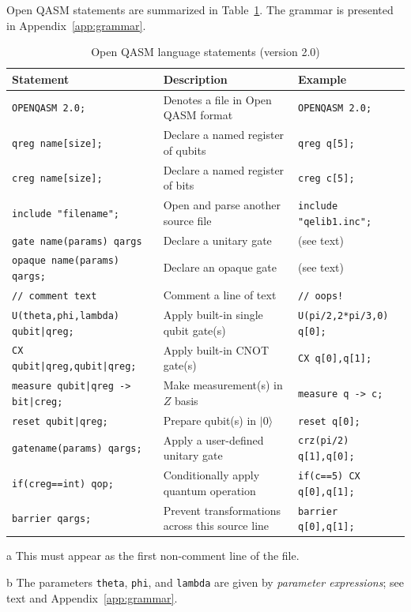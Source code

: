 \documentclass[USenglish,12pt,fleqn]{article} %
\newcommand*{\code}{\texttt}
\begin{document}
Open QASM statements are summarized in Table~\ref{tab:qasm:new}. The grammar is presented in Appendix~\ref{app:grammar}.

\begin{landscape}
\begin{table}[htbp]
\begin{threeparttable}
\caption{Open QASM language statements (version 2.0)\label{tab:qasm:new}}
\begin{tabular}{@{}lll@{}}
\toprule
Statement & Description & Example \\
\midrule
\code{OPENQASM 2.0;} & Denotes a file in Open QASM format\tnote{a} & \code{OPENQASM 2.0;}\\
\code{qreg name[size];} & Declare a named register of qubits & \code{qreg q[5];} \\
\code{creg name[size];} & Declare a named register of bits & \code{creg c[5];} \\
\code{include "filename";} & Open and parse another source file & \code{include "qelib1.inc";} \\ 
\code{gate name(params) qargs \string{ body \string}} & Declare a unitary gate &  (see text) \\
\code{opaque name(params) qargs;} & Declare an opaque gate & (see text) \\
\code{// comment text} & Comment a line of text & \code{// oops!} \\
\midrule
\code{U(theta,phi,lambda) qubit|qreg;} & Apply built-in single qubit gate(s)\tnote{b} & \code{U(pi/2,2*pi/3,0) q[0];} \\
\code{CX qubit|qreg,qubit|qreg;} & Apply built-in CNOT gate(s) & \code{CX q[0],q[1];} \\
\code{measure qubit|qreg -> bit|creg;} & Make measurement(s) in $Z$ basis & \code{measure q -> c;} \\
\code{reset qubit|qreg;} & Prepare qubit(s) in $|0\rangle$ & \code{reset q[0];} \\ 
\code{gatename(params) qargs;} & Apply a user-defined unitary gate &  \code{crz(pi/2) q[1],q[0];} \\
\code{if(creg==int) qop;} & Conditionally apply quantum operation & \code{if(c==5) CX q[0],q[1];} \\ 
\midrule
\code{barrier qargs;} & Prevent transformations across this source line & \code{barrier q[0],q[1];} \\
\bottomrule
\end{tabular}
\begin{tablenotes}
\item[a] This must appear as the first non-comment line of the file.
\item[b] The parameters \code{theta}, \code{phi}, and \code{lambda} are given by {\em parameter expressions}; see text and Appendix~\ref{app:grammar}.
\end{tablenotes}
\end{threeparttable}
\end{table}
\end{landscape}
\end{document}
